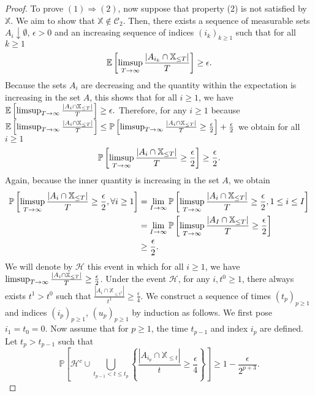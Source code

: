 \documentclass[aos]{imsart}
\theoremstyle{plain}
\theoremstyle{remark}
\newcommand{\Ccal}{\mathcal{C}}
\newcommand{\Hcal}{\mathcal{H}}
\newcommand{\Ebb}{\mathbb{E}}
\newcommand{\Pbb}{\mathbb{P}}
\newcommand{\Xbb}{\mathbb{X}}
\newcommand{\1}{\mathbbm{1}}%
\renewcommand{\limsup}{\mathop{\rm limsup}}
\begin{document}
\begin{proof}
To prove $(1)\Rightarrow (2)$, now suppose that property (2) is not satisfied by $\Xbb$. We aim to show that $\Xbb\notin\Ccal_2$. Then, there exists a sequence of measurable sets $A_i\downarrow\emptyset$, $\epsilon>0$ and an increasing sequence of indices $(i_k)_{k\geq 1}$ such that for all $k\geq 1$
\begin{equation*}
     \Ebb \left[\limsup_{T\to\infty} \frac{|A_{i_k}\cap\Xbb_{\leq T}|}{T} \right] \geq \epsilon.
\end{equation*}
Because the sets $A_i$ are decreasing and the quantity within the expectation is increasing in the set $A$, this shows that for all $i\geq 1$, we have $\Ebb \left[\limsup_{T\to\infty} \frac{|A_i\cap\Xbb_{\leq T}|}{T} \right] \geq \epsilon.$ Therefore, for any $i\geq 1$ because $\Ebb\left[\limsup_{T\to\infty} \frac{|A_i\cap\Xbb_{\leq T}|}{T} \right] \leq \Pbb\left[\limsup_{T\to\infty} \frac{|A_i\cap\Xbb_{\leq T}|}{T} \geq \frac{\epsilon}{2}\right] + \frac{\epsilon}{2}$ we obtain for all $i\geq 1$
\begin{equation*}
    \Pbb\left[\limsup_{T\to\infty} \frac{|A_i\cap\Xbb_{\leq T}|}{T} \geq \frac{\epsilon}{2} \right] \geq \frac{\epsilon}{2}.
\end{equation*}
Again, because the inner quantity is increasing in the set $A$, we obtain
\begin{align*}
    \Pbb\left[\limsup_{T\to\infty} \frac{|A_i\cap\Xbb_{\leq T}|}{T} \geq \frac{\epsilon}{2},\forall i\geq 1 \right] &= \lim_{I\to\infty} \Pbb\left[\limsup_{T\to\infty} \frac{|A_i\cap\Xbb_{\leq T}|}{T} \geq \frac{\epsilon}{2},1\leq i\leq I \right]\\
    &= \lim_{I\to\infty}\Pbb\left[\limsup_{T\to\infty} \frac{|A_I\cap\Xbb_{\leq T}|}{T} \geq \frac{\epsilon}{2}\right]\\
    &\geq \frac{\epsilon}{2}.
\end{align*}
We will denote by $\Hcal$ this event in which for all $i\geq 1$, we have $\limsup_{T\to\infty} \frac{|A_i\cap\Xbb_{\leq T}|}{T}\geq \frac{\epsilon}{2}$. Under the event $\Hcal$, for any $i,t^0\geq 1$, there always exists $t^1>t^0$ such that $\frac{|A_i\cap\Xbb_{\leq t^1}|}{t^1} \geq \frac{\epsilon}{4}.$ We construct a sequence of times $(t_p)_{p\geq 1}$ and indices $(i_p)_{p\geq 1}$, $(u_p)_{p\geq 1}$ by induction as follows. We first pose $i_1=t_0=0$. Now assume that for $p\geq 1$, the time $t_{p-1}$ and index $i_p$ are defined. Let $t_p>t_{p-1}$ such that
\begin{equation*}
    \Pbb\left[\Hcal^c \cup \bigcup_{t_{p-1}<t\leq t_p}\left\{\frac{|A_{i_p}\cap\Xbb_{\leq t}|}{t}\geq \frac{\epsilon}{4}\right\}\right]\geq 1-\frac{\epsilon}{2^{p+3}}.

\end{equation*}
\end{proof}
\end{document}
